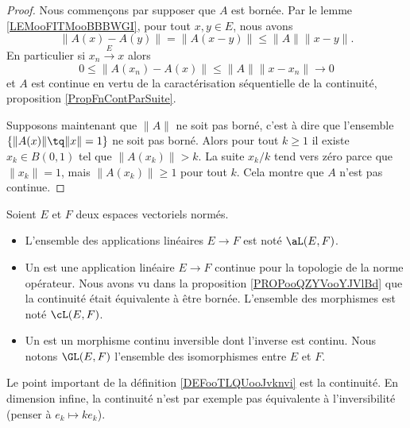\begin{proof}
    Nous commençons par supposer que \( A\) est bornée. Par le lemme \ref{LEMooFITMooBBBWGI}, pour tout \( x,y\in E\), nous avons
    \begin{equation}
        \| A(x)-A(y) \|=\| A(x-y) \|\leq \| A \|\| x-y \|.
    \end{equation}
    En particulier si \( x_n\stackrel{E}{\longrightarrow}x\) alors
    \begin{equation}
        0\leq \| A(x_n)-A(x) \|\leq \| A \|\| x-x_n \|\to 0
    \end{equation}
    et \( A\) est continue en vertu de la caractérisation séquentielle de la continuité, proposition \ref{PropFnContParSuite}.

    Supposons maintenant que \( \| A \|\) ne soit pas borné, c'est à dire que l'ensemble \( \{ \| A(x) \|\tq \| x \|=1 \}\) ne soit pas borné. Alors pour tout \( k\geq 1\) il existe \( x_k\in B(0,1)\) tel que \( \| A(x_k) \|>k\). La suite \( x_k/k\) tend vers zéro parce que \( \| x_k \|=1\), mais \( \| A(x_k) \|\geq 1\) pour tout \( k\). Cela montre que \( A\) n'est pas continue.
\end{proof}

\begin{definition}      \label{DEFooTLQUooJvknvi}
    Soient \( E\) et \( F\) deux espaces vectoriels normés.
    \begin{itemize}
        \item
            L'ensemble des applications linéaires \( E\to F\) est noté \( \aL(E,F)\).
        \item Un  est une application linéaire \( E\to F\) continue pour la topologie de la norme opérateur. Nous avons vu dans la proposition \ref{PROPooQZYVooYJVlBd} que la continuité était équivalente à être bornée. L'ensemble des morphismes est noté \( \cL(E,F)\). 
        \item
            Un  est un morphisme continu inversible dont l'inverse est continu. Nous notons \( \GL(E,F)\) l'ensemble des isomorphismes entre \( E\) et \( F\).
    \end{itemize}
\end{definition}

Le point important de la définition \ref{DEFooTLQUooJvknvi} est la continuité. En dimension infine, la continuité n'est par exemple pas équivalente à l'inversibilité (penser à \( e_k\mapsto ke_k\)).

